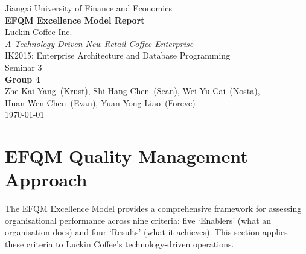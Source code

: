 \documentclass[12pt,a4paper]{article}
\title{}
\author{}
\date{}
\begin{document}
\thispagestyle{empty}
\vspace*{1.8cm}

\begin{center}
  {\normalsize Jiangxi University of Finance and Economics} \\[2.1cm]

  {\LARGE\bfseries EFQM Excellence Model Report} \\[1.0cm]

  {\Large Luckin Coffee Inc.} \\[0.25cm]
  {\normalsize\itshape A Technology-Driven New Retail Coffee Enterprise} \\[2.0cm]

  {\normalsize IK2015: Enterprise Architecture and Database Programming} \\[0.2cm]
  {\normalsize Seminar 3} \\[2.2cm]

  {\normalsize\textbf{Group 4}} \\[0.45cm]
  {\normalsize
    Zhe-Kai Yang~(Krust),\quad
    Shi-Hang Chen~(Sean),\quad
    Wei-Yu Cai~(Nosta), \\[0.2cm]
    Huan-Wen Chen~(Evan),\quad
    Yuan-Yong Liao~(Foreve)
  } \\[1.8cm]

  {\normalsize \today}
\end{center}

\newpage
\hypersetup{pageanchor=true}
\setcounter{page}{1}
\pagestyle{fancy}

\section{EFQM Quality Management Approach}
The EFQM Excellence Model provides a comprehensive framework for assessing organisational performance across nine criteria: five `Enablers' (what an organisation does) and four `Results' (what it achieves). This section applies these criteria to Luckin Coffee's technology-driven operations.
\end{document}
